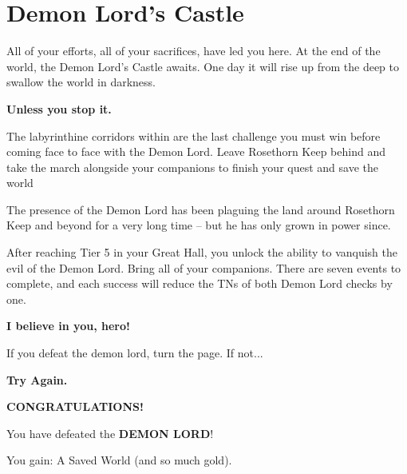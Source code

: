 \chapter{Demon Lord's Castle}

\thispagestyle{empty}

All of your efforts, all of your sacrifices, have led you here. At the end of the world, the Demon Lord’s Castle awaits. One day it will rise up from the deep to swallow the world in darkness.

\skipline

\textbf{Unless you stop it.}

\skipline

The labyrinthine corridors within are the last challenge you must win before coming face to face with the Demon Lord. Leave Rosethorn Keep behind and take the march alongside your companions to finish your quest and save the world

\skipline

The presence of the Demon Lord has been plaguing the land around Rosethorn Keep and beyond for a very long time – but he has only grown in power since.

\skipline

After reaching Tier 5 in your Great Hall, you unlock the ability to vanquish the evil of the Demon Lord. Bring all of your companions. There are seven events to complete, and each success will reduce the TNs of both Demon Lord checks by one.

\skipline %
\skipline %

\begin{adjustbox}{center}
	\textbf{\large{I believe in you, hero!}}
\end{adjustbox}

\pagebreak



If you defeat the demon lord, turn the page. If not...

\skipline
\skipline

\begin{adjustbox}{center}
	\textbf{Try Again.}
\end{adjustbox}

\pagebreak

\thispagestyle{empty}
\vspace*{\fill}
\begin{adjustbox}{center}
\end{adjustbox}
\begin{adjustbox}{center}
	\textbf{CONGRATULATIONS!}
\end{adjustbox}
\begin{adjustbox}{center}
	You have defeated the \textbf{DEMON LORD}!
\end{adjustbox}
\begin{adjustbox}{center}
	You gain: A Saved World (and so much gold).
\end{adjustbox}
\vspace*{\fill}
%
